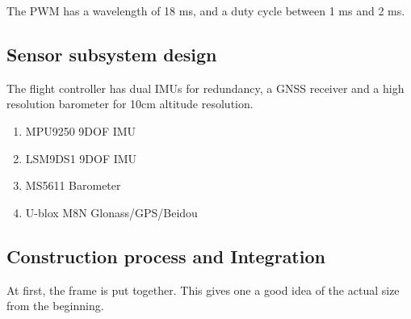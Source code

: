 The PWM has a wavelength of 18 ms, and a duty cycle between 1 ms and 2 ms.

\subsection{Sensor subsystem design}

The flight controller has dual IMUs for redundancy, a GNSS receiver and a high resolution barometer for 10cm altitude resolution.

\begin{enumerate}
\item MPU9250 9DOF IMU
\item LSM9DS1 9DOF IMU
\item MS5611 Barometer
\item U-blox M8N Glonass/GPS/Beidou
\end{enumerate}

\subsection{Construction process and Integration}

At first, the frame is put together. This gives one a good idea of the actual size from the beginning.


